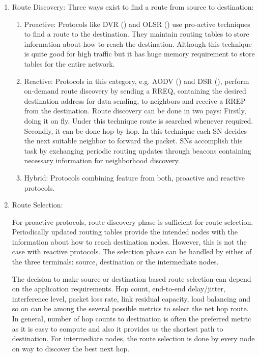 \begin{enumerate}

    \item \label{enumerate:RouteDiscovery} Route Discovery: Three ways exist to find a route from source to destination:

    \begin{enumerate}
    
    	\item Proactive: Protocols like \ac{DVR} (\cite{RFC1058}) and \ac{OLSR} (\cite{RFC3626}) use pro-active techniques to find a route to the destination. They maintain routing tables to store information about how to reach the destination. Although this technique is quite good for high traffic but it has huge memory requirement to store tables for the entire network.
    	
    	\item Reactive: Protocols in this category, e.g. \ac{AODV} (\cite{RFC3561}) and \ac{DSR} (\cite{RFC4728}), perform on-demand  route discovery by sending a \ac{RREQ}, containing the desired destination address for data sending, to neighbors and receive a \ac{RREP} from the destination. Route discovery can be done in two pays: Firstly, doing it on fly. Under this technique route is searched whenever required. Secondly, it can be done hop-by-hop. In this technique each \ac{SN} decides the next suitable neighbor to forward the packet. \acp{SN} accomplish this task by exchanging periodic routing updates through beacons containing necessary information for neighborhood discovery.
    		
    	\item Hybrid: Protocols combining feature from both, proactive and reactive protocols.

    \end{enumerate}

    \item \label{enumerate:RouteSelection} Route Selection:
    
    For proactive protocols, route discovery phase is sufficient for route selection. Periodically updated routing tables provide the intended nodes with the information about how to reach destination nodes. However, this is not the case with reactive protocols. The selection phase can be handled by either of the three terminals: source, destination or the intermediate nodes.
    
    \par	
    The decision to make source or destination based route selection can depend on the application requirements. Hop count, end-to-end delay/jitter, interference level, packet loss rate, link residual capacity, load balancing and so on can be among the several possible metrics to select the net hop route. In general, number of hop counts to destination is often the preferred metric as it is easy to compute and also it provides us the shortest path to destination. For intermediate nodes, the route selection is done by every node on way to discover the best next hop. 
    

\end{enumerate}
